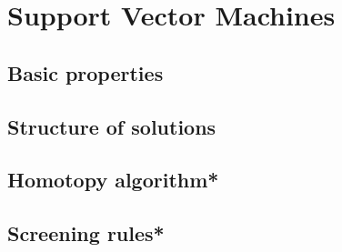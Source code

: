 \chapter{Support Vector Machines}
\label{chap:svm}

\section{Basic properties}

\section{Structure of solutions}

\section{Homotopy algorithm*}

\section{Screening rules*}